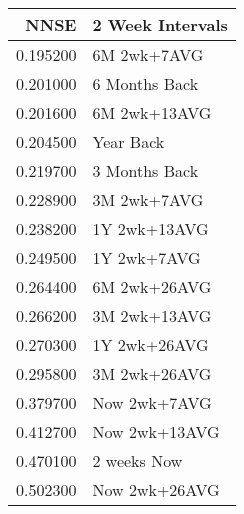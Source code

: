 \begin{tabular}{rl}
NNSE & 2 Week Intervals \\
\hline
0.195200 & 6M 2wk+7AVG \\
0.201000 & 6 Months Back \\
0.201600 & 6M 2wk+13AVG \\
0.204500 & Year Back \\
0.219700 & 3 Months Back \\
0.228900 & 3M 2wk+7AVG \\
0.238200 & 1Y 2wk+13AVG \\
0.249500 & 1Y 2wk+7AVG \\
0.264400 & 6M 2wk+26AVG \\
0.266200 & 3M 2wk+13AVG \\
0.270300 & 1Y 2wk+26AVG \\
0.295800 & 3M 2wk+26AVG \\
0.379700 & Now 2wk+7AVG \\
0.412700 & Now 2wk+13AVG \\
0.470100 & 2 weeks Now \\
0.502300 & Now 2wk+26AVG \\
\hline
\end{tabular}